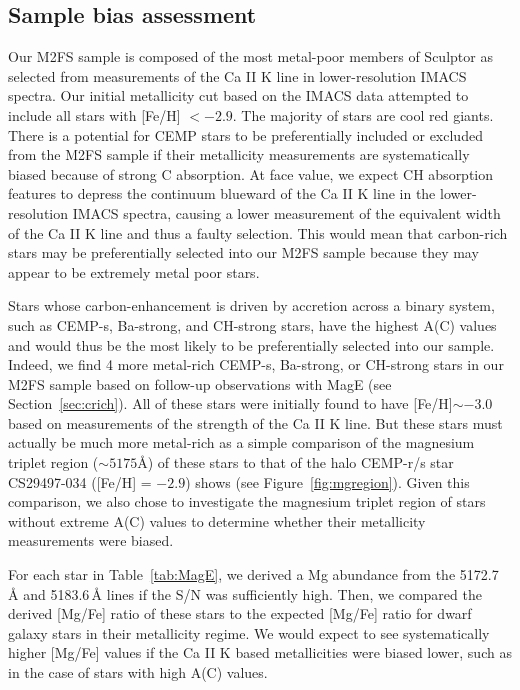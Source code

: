 \documentclass{emulateapj-rtx4}
\begin{document}

\subsection{Sample bias assessment}
\label{sec:resKP}

Our M2FS sample is composed of the most metal-poor members of Sculptor as selected from measurements of the Ca II K line in lower-resolution IMACS spectra. Our initial metallicity cut based on the IMACS data attempted to include all stars with [Fe/H] $< -2.9$.
The majority of stars are cool red giants. 
There is a potential for CEMP stars to be preferentially included or excluded from the M2FS sample if their metallicity measurements are systematically biased because of strong C absorption. 
At face value, we expect CH absorption features to depress the continuum blueward of the Ca II K line in the lower-resolution IMACS spectra, causing a lower measurement of the equivalent width of the Ca II K line and thus a faulty selection. 
This would mean that carbon-rich stars may be preferentially selected into our M2FS sample because they may appear to be extremely metal poor stars. 

Stars whose carbon-enhancement is driven by accretion across a binary system, such as CEMP-s, Ba-strong, and CH-strong stars, have the highest A(C) values and would thus be the most likely to be preferentially selected into our sample.
Indeed, we find 4 more metal-rich CEMP-s, Ba-strong, or CH-strong stars in our M2FS sample based on
follow-up observations with MagE (see Section~\ref{sec:crich}).  
All of these stars were initially found to have [Fe/H]$\sim -3.0$ based on measurements of the strength of the Ca II K line.
But these stars must actually be much more metal-rich as a simple comparison of the magnesium triplet region ($\sim5175$\AA) of these stars to that of the halo CEMP-r/s star CS29497-034 ([Fe/H] = $-2.9$) shows (see Figure~\ref{fig:mgregion}). 
Given this comparison, we also chose to investigate the magnesium triplet region of stars without extreme A(C) values to determine whether their metallicity measurements were biased.

For each star in Table~\ref{tab:MagE}, we derived a Mg abundance from the 5172.7\,\AA\,\,and 5183.6\,\AA\,\,lines if the S/N was sufficiently high.
Then, we compared the derived [Mg/Fe] ratio of these stars to the expected [Mg/Fe] ratio for dwarf galaxy stars in their metallicity regime.
We would expect to see systematically higher [Mg/Fe] values if the Ca II K based metallicities were biased lower, such as in the case of stars with high A(C) values.
\end{document}
